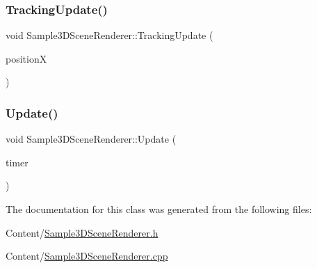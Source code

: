 \mbox{\label{class_cube_1_1_sample3_d_scene_renderer_af4f66156b00ceca7bcc4483c3cbfb7c5}} 
\subsubsection{\texorpdfstring{Tracking\+Update()}{TrackingUpdate()}}
{\footnotesize\ttfamily void Sample3\+D\+Scene\+Renderer\+::\+Tracking\+Update (\begin{DoxyParamCaption}\item[{float}]{positionX }\end{DoxyParamCaption})}

\mbox{\label{class_cube_1_1_sample3_d_scene_renderer_af555ad87256af7d64b7e042168b265c9}} 
\subsubsection{\texorpdfstring{Update()}{Update()}}
{\footnotesize\ttfamily void Sample3\+D\+Scene\+Renderer\+::\+Update (\begin{DoxyParamCaption}\item[{\hyperlink{class_d_x_1_1_step_timer}{D\+X\+::\+Step\+Timer} const \&}]{timer }\end{DoxyParamCaption})}



The documentation for this class was generated from the following files\+:\begin{DoxyCompactItemize}
\item 
Content/\hyperlink{_sample3_d_scene_renderer_8h}{Sample3\+D\+Scene\+Renderer.\+h}\item 
Content/\hyperlink{_sample3_d_scene_renderer_8cpp}{Sample3\+D\+Scene\+Renderer.\+cpp}\end{DoxyCompactItemize}
